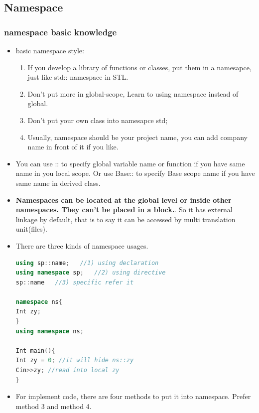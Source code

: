 \documentclass[a4paper,12pt,twoside]{book}
\begin{document}
\subsection{Namespace }
\subsubsection{namespace basic knowledge}
\begin{itemize}

\item basic namespace style:
\begin{enumerate}
\item If you develop a library of functions or classes, put them in a namesapce, just like std:: namespace in STL.

\item Don't put more in global-scope,  Learn to using namespace instead of global.

\item Don't put your own class into namesapce std;

\item Usually, namespace should be your project name, you can add company name in front of it if you like.
\end{enumerate}


\item You can use :: to specify global variable name or function if you have same name in you local scope.  Or use Base:: to specify Base scope name if you have same name in derived class.

\item \textbf{Namespaces can be located at the global level or inside other namespaces. They can't be placed in a block.}. So it has external linkage by default, that is to say it can be accessed by multi translation unit(files).


\item There are three kinds of namespace usages.
\begin{lstlisting}[frame=single, language=c++]
using sp::name;   //1) using declaration
using namespace sp;   //2) using directive
sp::name   //3) specific refer it

namespace ns{
Int zy;
}
using namespace ns;

Int main(){
Int zy = 0; //it will hide ns::zy
Cin>>zy; //read into local zy
}
\end{lstlisting}

\item For implement code, there are four methods to put it into namespace. Prefer method 3 and method 4.


\end{itemize}
\end{document}
